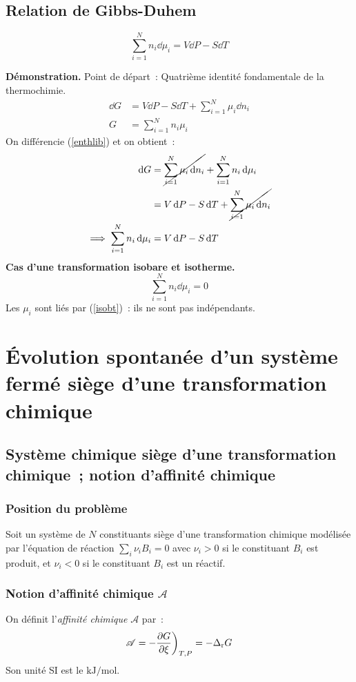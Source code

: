 \documentclass{article}
\let\oldref\ref
\renewcommand{\ref}[1]{(\oldref{#1})}
\newcommand{\Dr}{\Delta_{\mathrm{r}}}
\begin{document}
\subsection{Relation de Gibbs-Duhem}
\begin{tableau}
    \begin{enonce}
        $$\sum_{i=1}^N n_i\dd{\mu_i} = V\dd{P} - S\dd{T}$$
    \end{enonce}
    \textbf{Démonstration.} Point de départ~: Quatrième identité fondamentale de la thermochimie.
    \begin{align}
        \dd{G} &= V\dd{P} - S\dd{T} + \sum_{i=1}^N \mu_i \dd{n_i}\nonumber\\
        G&=\sum_{i=1}^N n_i\mu_i\label{enthlib}
    \end{align}
    On différencie \ref{enthlib} et on obtient~:
    \begin{align*}
        \dd{G} &= \cancel{\sum_{i=1}^N \mu_i \dd{n_i}} + \sum_{i=1}^N n_i \dd{\mu_i}\\
        &= V\dd{P} - S\dd{T} + \cancel{\sum_{i=1}^N \mu_i \dd{n_i}}\\
        \implies \sum_{i=1}^N n_i \dd{\mu_i} &= V\dd{P} - S\dd{T}
    \end{align*}
    \tcbline
    \textbf{Cas d'une transformation isobare et isotherme.}
    \begin{equation}\label{isobt}
        \sum_{i=1}^N n_i \dd{\mu_i} = 0
    \end{equation}
    Les $\mu_i$ sont liés par \ref{isobt}~: ils ne sont pas indépendants.
\end{tableau}
\section{Évolution spontanée d'un système fermé siège d'une transformation chimique}
\subsection{Système chimique siège d'une transformation chimique~; notion d'affinité chimique}
\subsubsection{Position du problème}
Soit un système de $N$ constituants siège d'une transformation chimique modélisée par l'équation de réaction $\sum_i \nu_i B_i = 0$ avec $\nu_i >0$ si le constituant $B_i$ est produit, et $\nu_i <0$ si le constituant $B_i$ est un réactif.
\subsubsection{Notion d'affinité chimique $\mathscr{A}$}
\begin{tableau}
    \begin{enonce}
        On définit l'\textit{affinité chimique} $\mathscr{A}$ par~:
        $$\mathscr{A} = -\pdv{G}{\xi}\bigg)_{T,P} = -\Dr G$$
        Son unité SI est le $\si{\kilo\joule\per\mole}$.
    \end{enonce}
\end{tableau}
\end{document}
